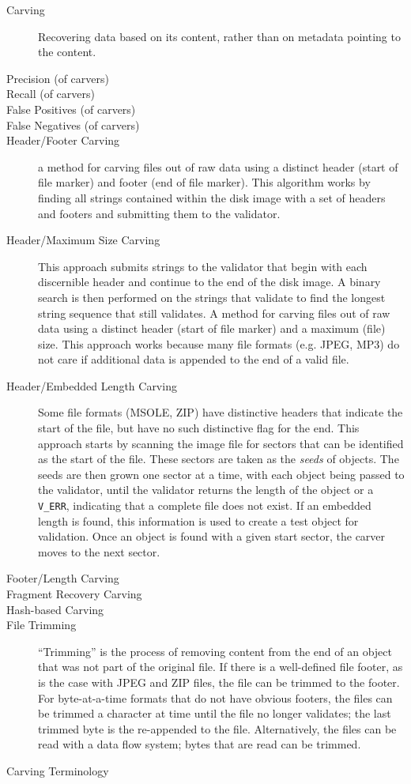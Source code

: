 \documentclass[11pt,letter]{article}
\begin{document}
\begin{table}
\begin{description}
\item[Carving] Recovering data based on its content, rather than on
  metadata pointing to the content.
\item[Precision (of carvers)]
\item[Recall (of carvers)]
\item[False Positives (of carvers)]
\item[False Negatives (of carvers)]
\item[Header/Footer Carving] a method for carving files out of raw
data using a distinct header (start of file marker) and footer (end of
file marker). This algorithm works by finding all strings contained
within the disk image with a set of headers and footers and submitting
them to the validator. 

\item[Header/Maximum Size Carving] This approach submits strings to
  the validator that begin with each discernible header and continue
  to the end of the disk image. A binary search is then performed on
  the strings that validate to find the longest string sequence that
  still validates. A method for carving files out of raw data using a
  distinct header (start of file marker) and a maximum (file)
  size. This approach works because many file formats (e.g. JPEG, MP3)
  do not care if additional data is appended to the end of a valid
  file.

\item[Header/Embedded Length Carving] Some file formats (MSOLE, ZIP) have distinctive headers that indicate
the start of the file, but have no such distinctive flag for the
end. This approach starts by scanning the image file for sectors that can be
identified as the start of the file. These sectors are taken as the
\emph{seeds} of objects. The seeds are then grown one sector at a
time, with each object being passed to the validator, until the
validator returns the length of the object or a \verb+V_ERR+,
indicating that a complete file does not exist. If an embedded length
is found, this information is used to create a test object for
validation. Once an object is found with a given start sector, the
carver moves to the next sector. 

\item[Footer/Length Carving]
\item[Fragment Recovery Carving]
\item[Hash-based Carving]
\item[File Trimming] ``Trimming'' is the process of removing content from the end of an
object that was not part of the original file. If there is a well-defined file footer, as is
the case with JPEG and ZIP files, the file can be trimmed to the
footer. For byte-at-a-time formats that do not have obvious footers, the files can 
be trimmed a character at time until the file no longer validates; the last
trimmed byte is the re-appended to the file.  Alternatively, the files
can be read with a data flow system; bytes that are read can be trimmed.
\end{description}
\caption{Carving Terminology}
\end{table}
\end{document}
